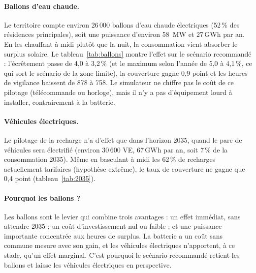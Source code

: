 \documentclass[11pt, a4paper]{report}
\newcommand{\pct}{\,\%}
\newcommand{\gwh}{\,GWh}
\begin{document}

\paragraph{Ballons d'eau chaude.} Le territoire compte environ 26\,000 ballons d'eau chaude électriques (52\pct{} des résidences principales), soit une puissance d'environ 58~MW et 27\gwh{} par an. En les chauffant à midi plutôt que la nuit, la consommation vient absorber le surplus solaire. Le tableau~\ref{tab:ballons} montre l'effet sur le scénario recommandé : l'écrêtement passe de 4,0 à 3,2\pct{} (et le maximum selon l'année de 5,0 à 4,1\pct, ce qui sort le scénario de la zone limite), la couverture gagne 0,9 point et les heures de vigilance baissent de 878 à 758. Le simulateur ne chiffre pas le coût de ce pilotage (télécommande ou horloge), mais il n'y a pas d'équipement lourd à installer, contrairement à la batterie.


\paragraph{Véhicules électriques.} Le pilotage de la recharge n'a d'effet que dans l'horizon 2035, quand le parc de véhicules sera électrifié (environ 30\,600 VE, 67\gwh{} par an, soit 7\pct{} de la consommation 2035). Même en basculant à midi les 62\pct{} de recharges actuellement tarifaires (hypothèse extrême), le taux de couverture ne gagne que 0,4 point (tableau~\ref{tab:2035}).

\paragraph{Pourquoi les ballons ?} Les ballons sont le levier qui combine trois avantages : un effet immédiat, sans attendre 2035 ; un coût d'investissement nul ou faible ; et une puissance importante concentrée aux heures de surplus. La batterie a un coût sans commune mesure avec son gain, et les véhicules électriques n'apportent, à ce stade, qu'un effet marginal. C'est pourquoi le scénario recommandé retient les ballons et laisse les véhicules électriques en perspective.
\end{document}
